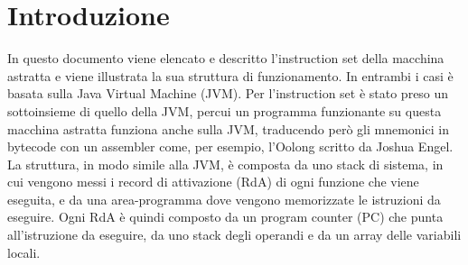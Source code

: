 \section{Introduzione}
\label{sec:introduzione}
In questo documento viene elencato e descritto l'instruction set della macchina astratta e viene illustrata la sua struttura di funzionamento. In entrambi i casi \`e basata sulla Java Virtual Machine (JVM). Per l'instruction set \`e stato preso un sottoinsieme di quello della JVM, percui un programma funzionante su questa macchina astratta funziona anche sulla JVM, traducendo per\`o gli mnemonici in bytecode con un assembler come, per esempio, l'Oolong scritto da Joshua Engel. La struttura, in modo simile alla JVM, \`e composta da uno stack di sistema, in cui vengono messi i record di attivazione (RdA) di ogni funzione che viene eseguita, e da una area-programma dove vengono memorizzate le istruzioni da eseguire. Ogni RdA \`e quindi composto da un program counter (PC) che punta all'istruzione da eseguire, da uno stack degli operandi e da un array delle variabili locali.
